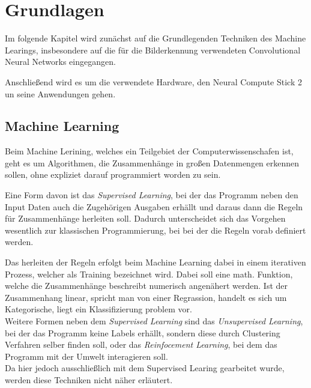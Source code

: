 \chapter{Grundlagen}\label{kap:grundlagen}


Im folgende Kapitel wird zunächst auf die Grundlegenden Techniken
 des Machine Learings, insbesondere auf die für die Bilderkennung 
verwendeten Convolutional Neural Networks eingegangen.

Anschließend wird es um die verwendete Hardware, den Neural 
Compute Stick 2 un seine Anwendungen gehen.



\section{Machine Learning}\label{sec:ml}

Beim Machine Lerining, welches ein Teilgebiet der Computerwissenschafen
ist, geht es um Algorithmen, die Zusammenhänge in großen Datenmengen 
erkennen sollen, ohne expliziet darauf programmiert worden zu sein.

Eine Form davon ist das \textit{Supervised Learning}, bei der das Programm 
neben den Input Daten auch die Zugehörigen Ausgaben erhällt und daraus 
dann die Regeln für Zusammenhänge herleiten soll.
Dadurch unterscheidet sich das Vorgehen wesentlich zur klassischen Programmierung,
bei bei der die Regeln vorab definiert werden.

\vspace{0.5cm}
\begin{figure}[htb]
    \centering
    \def\svgwidth{0.8\columnwidth}
    \footnotesize
    
\end{figure}
\vspace{0.5cm}

Das herleiten der Regeln erfolgt beim Machine Learning dabei in einem 
iterativen Prozess, welcher als Training bezeichnet wird.
Dabei soll eine math. Funktion, welche die Zusammenhänge beschreibt 
numerisch angenähert werden. Ist der Zusammenhang linear, spricht man 
von einer Regrassion, handelt es sich um Kategorische, liegt 
ein Klassifizierung problem vor.
\\
Weitere Formen neben dem \textit{Supervised Learning} sind das 
\textit{Unsupervised Learning}, bei der das Programm keine Labels 
erhällt, sondern diese durch Clustering Verfahren selber finden 
soll, oder das \textit{Reinfocement Learning}, bei dem das Programm 
mit der Umwelt interagieren soll.
\\
Da hier jedoch ausschließlich mit dem Supervised Learing gearbeitet
wurde, werden diese Techniken nicht näher erläutert.


